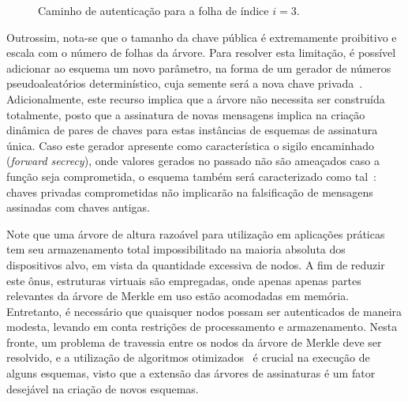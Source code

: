 \documentclass{ufsctex/ufsctex}
\newcommand{\pk}{\mathcal{P}_k}
\begin{document}
\begin{figure}
  \centering
  \caption{Caminho de autenticação para a folha de índice $i = 3$.}\label{fig:9}
\end{figure}

Outrossim, nota-se que o tamanho da chave pública é extremamente proibitivo e
escala com o número de folhas da árvore. Para resolver esta limitação, é
possível adicionar ao esquema um novo parâmetro, na forma de um gerador de
números pseudoaleatórios determinístico, cuja semente será a nova chave
privada~\cite[6.4.2.3]{Goldreich:2004:FCV:975541}. Adicionalmente, este recurso
implica que a árvore não necessita ser construída totalmente, posto que a
assinatura de novas mensagens implica na criação dinâmica de pares de chaves
para estas instâncias de esquemas de assinatura única. Caso este gerador
apresente como característica o sigilo encaminhado (\emph{forward secrecy}),
onde valores gerados no passado não são ameaçados caso a função seja
comprometida, o esquema também será caracterizado como
tal~\cite{Bernstein:2008:PQC:1522375}: chaves privadas comprometidas não
implicarão na falsificação de mensagens assinadas com chaves antigas.

Note que uma árvore de altura razoável para utilização em aplicações práticas
tem seu armazenamento total impossibilitado na maioria absoluta dos
dispositivos alvo, em vista da quantidade excessiva de nodos. A fim de reduzir
este ônus, estruturas virtuais são empregadas, onde apenas apenas partes
relevantes da árvore de Merkle em uso estão acomodadas em memória. Entretanto,
é necessário que quaisquer nodos possam ser autenticados de maneira modesta,
levando em conta restrições de processamento e armazenamento. Nesta fronte, um
problema de travessia entre os nodos da árvore de Merkle deve ser resolvido, e
a utilização de algoritmos otimizados~\cite{Buchmann:2008:MTT:1473109.1473114}
é crucial na execução de alguns esquemas, visto que a extensão das árvores de
assinaturas é um fator desejável na criação de novos esquemas.
\end{document}
